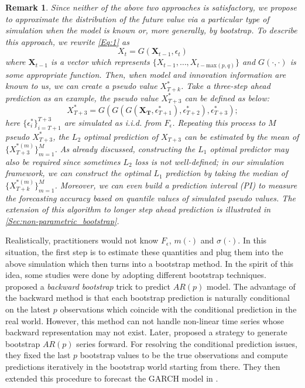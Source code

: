 \documentclass[a4paper]{article}
\newtheorem*{Remarknn}{Remark}
\begin{document}
\begin{Remarknn} \label{Re.Intro}
Since neither of the above two approaches is satisfactory, we propose to approximate the distribution of the future value via  a particular type
of {\it simulation}  when the model
is known or, more generally, by {\it bootstrap}. To describe this approach, we rewrite \cref{Eq:1} as 
$$X_{t} = G(\bm{X}_{t-1},\epsilon_t)$$
 where $\bm{X}_{t-1}$ is a vector which represents $\{X_{t-1},\ldots,X_{t-\text{max}(p,q)}\}$ and $G(\cdot,\cdot)$ is some appropriate function.
  Then, when model and innovation information are known to us, we can create a pseudo value $X^*_{T+k}$. Take a three-step ahead prediction as an example, the pseudo value $X^*_{T+3}$ can be defined as below:
\begin{equation}\label{Eq:3}
    X^*_{T+3} =  G(G(G(\bm{X_T},\epsilon^*_{T+1}),\epsilon^*_{T+2}),\epsilon^*_{T+3});
\end{equation}
here $\{\epsilon^*_i\}_{i=T+1}^{T+3}$ are simulated as i.i.d. from $F_{\epsilon}$. Repeating this process to $M$ pseudo $X^*_{T+3}$, the $L_2$ optimal prediction of $X_{T+3}$ can be estimated by the mean of $\{X^{*(m)}_{T+3}\}_{m=1}^{M}$. 
As already discussed, constructing the $L_1$ optimal predictor may also be required since sometimes $L_2$ loss is not well-defined; in our simulation framework, we can construct the optimal $L_1$ prediction by taking the median of $\{X^{*(m)}_{T+k}\}_{m=1}^{M}$. Moreover, we can even build a prediction interval (PI) to measure the forecasting accuracy based on quantile values of simulated pseudo values. The extension of this algorithm to longer step ahead prediction is illustrated in \cref{Sec:non-parametric_bootstrap}.  
\end{Remarknn}

Realistically, practitioners would not know $F_{\epsilon}$, $m(\cdot)$ and $\sigma(\cdot)$. In this situation, the first step is to estimate these quantities and
plug them into the above simulation  which then
 turns into  a bootstrap method. In the spirit of this idea, some studies were done by adopting different bootstrap techniques. \cite{thombs1990bootstrap} proposed a \textit{backward bootstrap} trick to predict $AR(p)$ model. The advantage of the backward method is that each bootstrap prediction is naturally conditional on the latest $p$ observations which coincide with the conditional prediction in the real world. However, this method can not handle non-linear time series whose backward representation may not exist. Later, \cite{pascual2004bootstrap} proposed a strategy to generate bootstrap $AR(p)$ series forward. For resolving the conditional prediction issues, they fixed the last $p$ bootstrap values to be the true observations and compute predictions iteratively in the bootstrap world starting from there. They then extended this procedure to forecast the GARCH model in \cite{pascual2006bootstrap}. 
\end{document}
